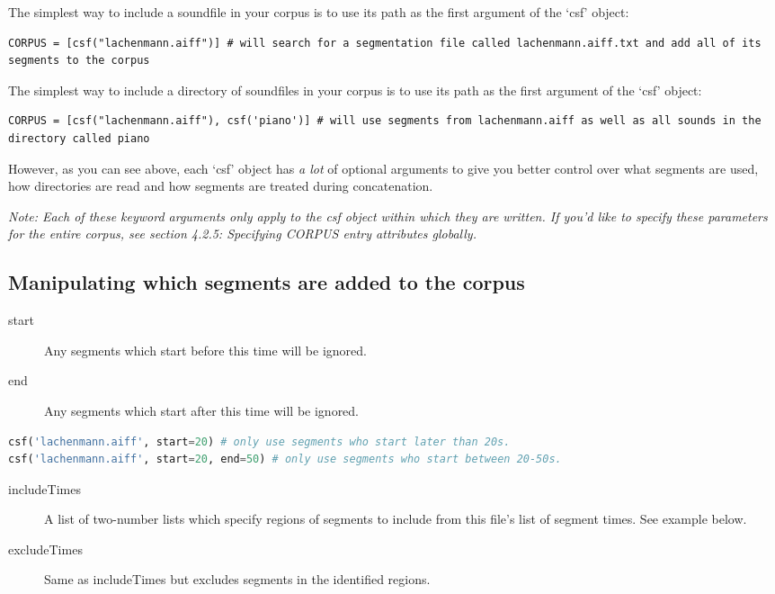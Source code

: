 \documentclass{article}
\begin{document}
\begin{spacing}{1.2}
The simplest way to include a soundfile in your corpus is to use its path as the first argument of the `csf' object:
\begin{lstlisting}
CORPUS = [csf("lachenmann.aiff")] # will search for a segmentation file called lachenmann.aiff.txt and add all of its segments to the corpus
\end{lstlisting}

The simplest way to include a directory of soundfiles in your corpus is to use its path as the first argument of the `csf' object:
\begin{lstlisting}
CORPUS = [csf("lachenmann.aiff"), csf('piano')] # will use segments from lachenmann.aiff as well as all sounds in the directory called piano
\end{lstlisting}

\noindent However, as you can see above, each `csf' object has \emph{a lot} of optional arguments to give you better control over what segments are used, how directories are read and how segments are treated during concatenation.  

\emph{Note: Each of these keyword arguments only apply to the csf object within which they are written.  If you'd like to specify these parameters for the entire corpus, see section 4.2.5: Specifying CORPUS entry attributes globally.}

\subsection{Manipulating which segments are added to the corpus}
\begin{description}
\item[start] Any segments which start before this time will be ignored.
\item[end] Any segments which start after this time will be ignored.
\end{description}

\begin{lstlisting}[language=python]
csf('lachenmann.aiff', start=20) # only use segments who start later than 20s.
csf('lachenmann.aiff', start=20, end=50) # only use segments who start between 20-50s.
\end{lstlisting}

\begin{description}
\item[includeTimes] A list of two-number lists which specify regions of segments to include from this file's list of segment times.  See example below.
\item[excludeTimes] Same as includeTimes but excludes segments in the identified regions.
\end{description}


\end{spacing}
\end{document}
